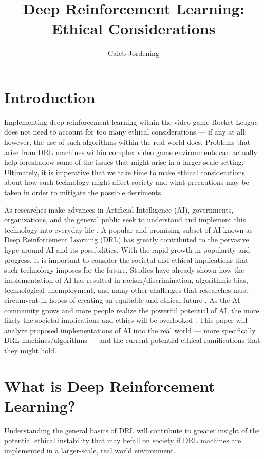 \documentclass[10pt,twocolumn]{article}
\title{Deep Reinforcement Learning: Ethical Considerations}
\author{Caleb Jordening}
\affiliation{Occidental College}
\begin{document}
\maketitle

\section{Introduction}
Implementing deep reinforcement learning within the video game Rocket League does not need to account for too many ethical considerations  — if any at all; however, the use of such algorithms within the real world does. Problems that arise from DRL machines within complex video game environments can actually help foreshadow some of the issues that might arise in a larger scale setting. Ultimately, it is imperative that we take time to make ethical considerations about how such technology might affect society and what precautions may be taken in order to mitigate the possible detriments.

As researches make advances in Artificial Intelligence (AI), governments, organizations, and the general public seek to understand and implement this technology into everyday life \cite{SchiffBBL20}. A popular and promising subset of AI known as Deep Reinforcement Learning (DRL) has greatly contributed to the pervasive hype around AI and its possibilities. With the rapid growth in popularity and progress, it is important to consider the societal and ethical implications that such technology imposes for the future. Studies have already shown how the implementation of AI has resulted in racism/discrimination, algorithmic bias, technological unemployment, and many other challenges that researches must circumvent in hopes of creating an equitable and ethical future \cite{SchiffBBL20}. As the AI community grows and  more people realize the powerful potential of AI, the more likely the societal implications and ethics will be overlooked \cite{10.1613/jair.1.12360}. This paper will analyze proposed implementations of AI into the real world — more specifically DRL machines/algorithms — and the current potential ethical ramifications that they might hold.

\section{What is Deep Reinforcement Learning?}
Understanding the general basics of DRL will contribute to greater insight of the potential ethical instability that may befall on society if DRL machines are implemented in a larger-scale, real world environment. 
\end{document}
